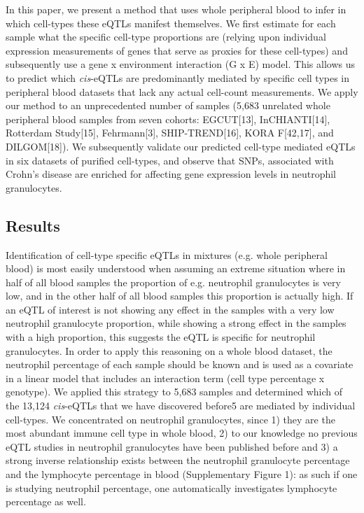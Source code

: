   In this paper, we present a method that uses whole peripheral blood to infer in which cell-types these 
  eQTLs manifest themselves. We first estimate for each sample what the specific cell-type proportions 
  are (relying upon individual expression measurements of genes that serve as proxies for these cell-types) 
  and subsequently use a gene x environment interaction (G x E) model. This allows us to predict which 
  \emph{cis}-eQTLs are predominantly mediated by specific cell types in peripheral blood datasets that lack 
  any actual cell-count measurements. We apply our method to an unprecedented number of samples (5,683 
  unrelated whole peripheral blood samples from seven cohorts: EGCUT[13], InCHIANTI[14], Rotterdam Study[15], 
  Fehrmann[3], SHIP-TREND[16], KORA F[42,17], and DILGOM[18]). We subsequently validate our predicted 
  cell-type mediated eQTLs in six datasets of purified cell-types, and observe that SNPs, associated 
  with Crohn's disease are enriched for affecting gene expression levels in neutrophil granulocytes.

  \subsection{Results}
  Identification of cell-type specific eQTLs in mixtures (e.g. whole peripheral blood) is most easily 
  understood when assuming an extreme situation where in half of all blood samples the proportion of 
  e.g. neutrophil granulocytes is very low, and in the other half of all blood samples this proportion 
  is actually high. If an eQTL of interest is not showing any effect in the samples with a very low 
  neutrophil granulocyte proportion, while showing a strong effect in the samples with a high proportion, 
  this suggests the eQTL is specific for neutrophil granulocytes. In order to apply this reasoning on 
  a whole blood dataset, the neutrophil percentage of each sample should be known and is used as a 
  covariate in a linear model that includes an interaction term (cell type percentage x genotype). 
  We applied this strategy to 5,683 samples and determined which of the 13,124 \emph{cis}-eQTLs that we have 
  discovered before5 are mediated by individual cell-types. We concentrated on neutrophil granulocytes, 
  since 1) they are the most abundant immune cell type in whole blood, 2) to our knowledge no previous 
  eQTL studies in neutrophil granulocytes have been published before and 3) a strong inverse 
  relationship exists between the neutrophil granulocyte percentage and the lymphocyte percentage in 
  blood (Supplementary Figure 1): as such if one is studying neutrophil percentage, one automatically 
  investigates lymphocyte percentage as well.

